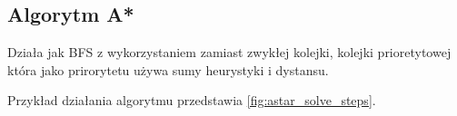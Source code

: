 \documentclass[../../../../doc.tex]{subfiles}
\begin{document}
\subsection{Algorytm A*}

Działa jak BFS z wykorzystaniem zamiast zwykłej kolejki, kolejki prioretytowej która jako prirorytetu używa
sumy heurystyki i dystansu.


Przykład działania algorytmu przedstawia \cref{fig:astar_solve_steps}.


\end{document}
